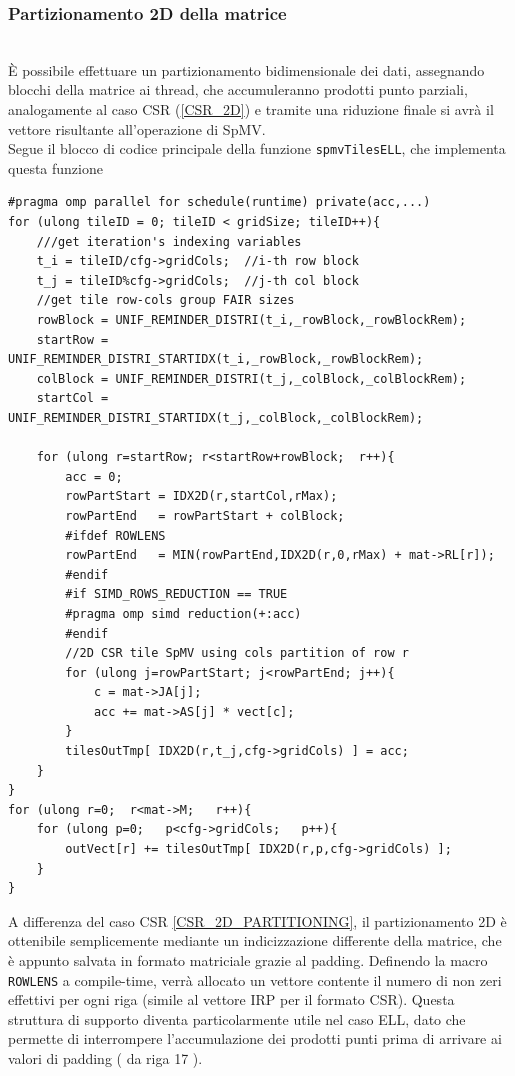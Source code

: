 \documentclass[acmsmall,nonacm=true]{acmart}
\newcommand{\vvv}[1]{{\small\texttt{#1}}}
\begin{document}
\subsubsection{Partizionamento 2D della matrice}\hfill\\	%
È possibile effettuare un partizionamento bidimensionale dei dati, \label{spmvTilesELL}
assegnando blocchi della matrice ai thread, che accumuleranno prodotti punto
parziali, analogamente al caso CSR (\ref{CSR_2D}) e tramite 
una riduzione finale si avrà il vettore risultante all'operazione di SpMV.\\
Segue il blocco di codice principale della funzione \vvv{spmvTilesELL}, 
che implementa questa funzione
\begin{lstlisting}
#pragma omp parallel for schedule(runtime) private(acc,...)
for (ulong tileID = 0; tileID < gridSize; tileID++){
    ///get iteration's indexing variables
    t_i = tileID/cfg->gridCols;  //i-th row block
    t_j = tileID%cfg->gridCols;  //j-th col block
    //get tile row-cols group FAIR sizes
    rowBlock = UNIF_REMINDER_DISTRI(t_i,_rowBlock,_rowBlockRem);
    startRow = UNIF_REMINDER_DISTRI_STARTIDX(t_i,_rowBlock,_rowBlockRem);
    colBlock = UNIF_REMINDER_DISTRI(t_j,_colBlock,_colBlockRem);
    startCol = UNIF_REMINDER_DISTRI_STARTIDX(t_j,_colBlock,_colBlockRem);

    for (ulong r=startRow; r<startRow+rowBlock;  r++){
        acc = 0;
        rowPartStart = IDX2D(r,startCol,rMax);
        rowPartEnd   = rowPartStart + colBlock; 
        #ifdef ROWLENS
        rowPartEnd   = MIN(rowPartEnd,IDX2D(r,0,rMax) + mat->RL[r]);
        #endif
        #if SIMD_ROWS_REDUCTION == TRUE
        #pragma omp simd reduction(+:acc)
        #endif
        //2D CSR tile SpMV using cols partition of row r
        for (ulong j=rowPartStart; j<rowPartEnd; j++){
            c = mat->JA[j];
            acc += mat->AS[j] * vect[c];
        }
        tilesOutTmp[ IDX2D(r,t_j,cfg->gridCols) ] = acc;
    }
}
for (ulong r=0;  r<mat->M;   r++){
    for (ulong p=0;   p<cfg->gridCols;   p++){
        outVect[r] += tilesOutTmp[ IDX2D(r,p,cfg->gridCols) ];
    }
}
\end{lstlisting}
A differenza del caso CSR \ref{CSR_2D_PARTITIONING}, 
il partizionamento 2D è ottenibile semplicemente mediante un indicizzazione
differente della matrice, che è appunto salvata in formato matriciale grazie al
padding.
Definendo la macro \vvv{ROWLENS} a compile-time, verrà allocato un vettore
contente il numero di non zeri effettivi per ogni riga (simile al vettore IRP
per il formato CSR). Questa struttura di supporto diventa particolarmente utile
nel caso ELL, dato che permette di interrompere l'accumulazione dei prodotti
punti prima di arrivare ai valori di padding ( da riga 17 ).
\end{document}
